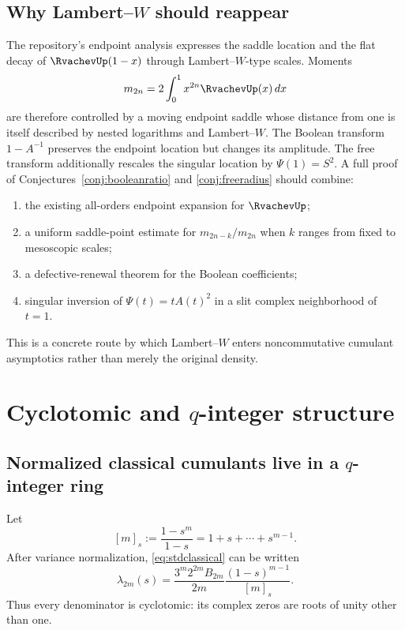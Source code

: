 \documentclass[11pt,oneside]{article}
\theoremstyle{definition}
\theoremstyle{remark}
\begin{document}
\subsection{Why Lambert--\texorpdfstring{\(W\)}{W} should reappear}
The repository's endpoint analysis expresses the saddle location and the flat decay of \(\RvachevUp(1-x)\) through Lambert--\(W\)-type scales. Moments
\[
m_{2n}=2\int_0^1x^{2n}\RvachevUp(x)\,dx
\]
are therefore controlled by a moving endpoint saddle whose distance from one is itself described by nested logarithms and Lambert--\(W\). The Boolean transform \(1-A^{-1}\) preserves the endpoint location but changes its amplitude. The free transform additionally rescales the singular location by \(\Psi(1)=S^2\). A full proof of Conjectures~\ref{conj:booleanratio} and \ref{conj:freeradius} should combine:
\begin{enumerate}[label=(\alph*)]
\item the existing all-orders endpoint expansion for \(\RvachevUp\);
\item a uniform saddle-point estimate for \(m_{2n-k}/m_{2n}\) when \(k\) ranges from fixed to mesoscopic scales;
\item a defective-renewal theorem for the Boolean coefficients;
\item singular inversion of \(\Psi(t)=tA(t)^2\) in a slit complex neighborhood of \(t=1\).
\end{enumerate}
This is a concrete route by which Lambert--\(W\) enters noncommutative cumulant asymptotics rather than merely the original density.

\section{Cyclotomic and \texorpdfstring{\(q\)}{q}-integer structure}
\subsection{Normalized classical cumulants live in a \texorpdfstring{\(q\)}{q}-integer ring}
Let
\[
[m]_s:=\frac{1-s^m}{1-s}=1+s+\cdots+s^{m-1}.
\]
After variance normalization, \eqref{eq:stdclassical} can be written
\begin{equation}\label{eq:lambdakrational}
\lambda_{2m}(s)=
\frac{3^m2^{2m}B_{2m}}{2m}\frac{(1-s)^{m-1}}{[m]_s}.
\end{equation}
Thus every denominator is cyclotomic: its complex zeros are roots of unity other than one.
\end{document}
